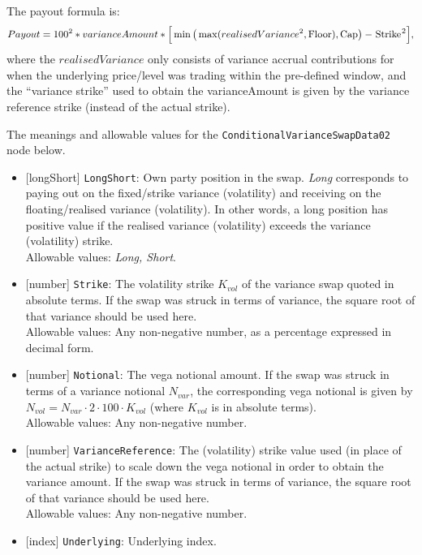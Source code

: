 The payout formula is:
\begin{equation*}
  Payout = 100^2 * varianceAmount * \Big[ \min \big( \max (realisedVariance^2, \text{\lstinline!Floor!}), \text{\lstinline!Cap!}\big) - \text{\lstinline!Strike!}^2 \Big],
\end{equation*}
where the $realisedVariance$ only consists of variance accrual contributions for when the underlying price/level
was trading within the pre-defined window, and the ``variance strike'' used to obtain the varianceAmount is
given by the variance reference strike (instead of the actual strike).

The meanings and allowable values for the \lstinline!ConditionalVarianceSwapData02! node below.

\begin{itemize}
  \item{}[longShort] \lstinline!LongShort!: Own party position in the swap. \emph{Long} corresponds to paying out on the
  fixed/strike variance (volatility) and receiving on the floating/realised variance (volatility). In other words,
  a long position has positive value if the realised variance (volatility) exceeds the variance (volatility)
  strike. \\
  Allowable values: \emph{Long, Short}.
  \item{}[number] \lstinline!Strike!: The volatility strike $K_{vol}$ of the variance swap quoted in absolute terms.
  If the swap was struck in terms of variance, the square root of that variance should be used here. \\
  Allowable values: Any non-negative number, as a percentage expressed in decimal form.
  \item{}[number] \lstinline!Notional!: The vega notional amount. If the swap was struck in terms of a variance notional
  $N_{var}$, the corresponding vega notional is given by $N_{vol} = N_{var} \cdot 2 \cdot 100 \cdot K_{vol}$ (where
  $K_{vol}$ is in absolute terms). \\
  Allowable values: Any non-negative number.
  \item{}[number] \lstinline!VarianceReference!: The (volatility) strike value used (in place of the actual strike) to scale down the
  vega notional in order to obtain the variance amount. If the swap was struck in terms of variance, the square root of that
  variance should be used here. \\
  Allowable values: Any non-negative number.
  \item{}[index] \lstinline!Underlying!: Underlying index. \\

\end{itemize}
